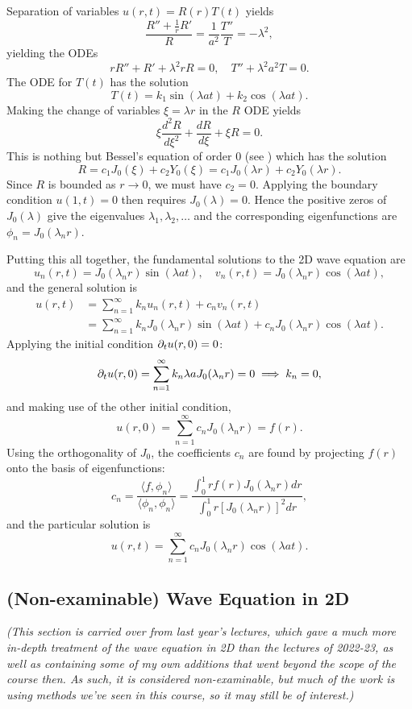 Separation of variables $u(r,t) = R(r)T(t)$ yields
\[
	\frac{R'' + \frac{1}{r}R'}{R} = \frac{1}{a^2} \frac{T''}{T} = -\lambda^2,
\]
yielding the ODEs
\[
	rR'' + R' + \lambda^2rR = 0, \quad T'' + \lambda^2 a^2 T = 0.
\]
The ODE for $T(t)$ has the solution
\[
	T(t) = k_1\sin(\lambda at) + k_2\cos(\lambda at).
\]
Making the change of variables $\xi = \lambda r$ in the $R$ ODE yields
\[
	\xi \frac{d^2R}{d\xi^2} + \frac{dR}{d\xi} + \xi R = 0.
\]
This is nothing but Bessel's equation of order 0 (see ) which has the solution
\[
	R = c_1 J_0(\xi) + c_2 Y_0(\xi) = c_1 J_0(\lambda r) + c_2 Y_0(\lambda r).
\]
Since $R$ is bounded as $r \to 0$, we must have $c_2=0$. Applying the boundary condition $u(1,t)=0$ then requires $J_0(\lambda)=0$. Hence the positive zeros of $J_0(\lambda)$ give the eigenvalues $\lambda_1, \lambda_2, \ldots$ and the corresponding eigenfunctions are $\phi_n = J_0(\lambda_n r)$.

Putting this all together, the fundamental solutions to the 2D wave equation are
\[
	u_n(r,t) = J_0(\lambda_n r)\sin(\lambda at), \quad v_n(r,t) = J_0(\lambda_n r)\cos(\lambda at),
\]
and the general solution is
\begin{align*}
	u(r,t) &= \sum_{n=1}^{\infty} k_n u_n(r,t) + c_n v_n(r,t) \\
	&= \sum_{n=1}^{\infty} k_n J_0(\lambda_n r)\sin(\lambda at) + c_n J_0(\lambda_n r)\cos(\lambda at).
\end{align*}
Applying the initial condition $\partial_t u(r,0) = 0$:
\[
	\partial_t u(r,0) = \sum_{n=1}^{\infty} k_n \lambda a J_0(\lambda_n r) = 0 \implies k_n = 0,
\]
and making use of the other initial condition,
\[
	u(r,0) = \sum_{n=1}^{\infty} c_n J_0(\lambda_n r) = f(r).
\]
Using the orthogonality of $J_0$, the coefficients $c_n$ are found by projecting $f(r)$ onto the basis of eigenfunctions:
\[
	c_n = \frac{\langle f, \phi_n\rangle}{\langle \phi_n, \phi_n\rangle} = \frac{\int_0^1 rf(r)J_0(\lambda_n r)dr}{\int_0^1 r [J_0(\lambda_n r)]^2dr},
\]
and the particular solution is
\[
	u(r,t) = \sum_{n=1}^{\infty} c_n J_0(\lambda_n r)\cos(\lambda at).
\]


\subsection{(Non-examinable) Wave Equation in 2D}\label{sec:waveeqn2dne}

\emph{(This section is carried over from last year's lectures, which gave a much more in-depth treatment of the wave equation in 2D than the lectures of 2022-23, as well as containing some of my own additions that went beyond the scope of the course then. As such, it is considered non-examinable, but much of the work is using methods we've seen in this course, so it may still be of interest.)}

